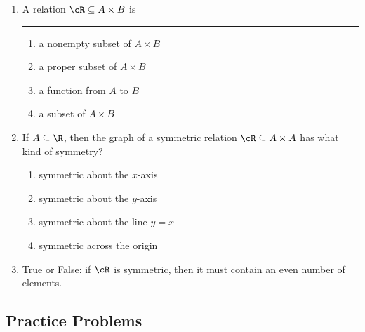 \begin{enumerate}
    \item A relation $\cR \subseteq A \times B$ is \rule{3cm}{0.15mm}
    \begin{enumerate}
        \item a nonempty subset of $A \times B$
        \item a proper subset of $A \times B$
        \item a function from $A$ to $B$
        \item a subset of $A \times B$
    \end{enumerate}

    \item If $A \subseteq \R$, then the graph of a symmetric relation $\cR \subseteq A \times A$ has what kind of symmetry?
    \begin{enumerate}
        \item symmetric about the $x$-axis
        \item symmetric about the $y$-axis
        \item symmetric about the line $y = x$
        \item symmetric across the origin
    \end{enumerate}

    \item True or False: if $\cR$ is symmetric, then it must contain an even number of elements.
\end{enumerate}

\subsection*{Practice Problems}


